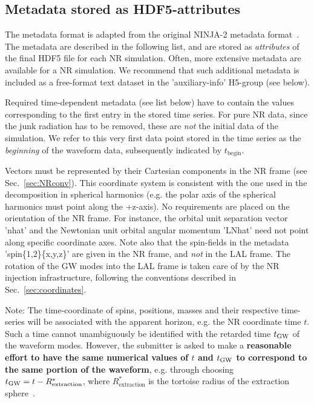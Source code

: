 \documentclass[11pt,tightenlines,article,amssymb,amsmath,amsfonts,superscriptaddress,nofootinbib]{revtex4}
\newcommand{\tGW}{t_{\rm GW}}
\begin{document}
\subsection{Metadata stored as HDF5-attributes}
\label{sec:meta}
The metadata format is adapted from the original NINJA-2 metadata format~\cite{Brown:2007jx}. The metadata are described in the following list, and are stored as \emph{attributes} of the final HDF5 file for each NR simulation. Often, more extensive metadata are available for a NR simulation. We recommend that such additional metadata is included as a free-format text dataset in the 'auxiliary-info' H5-group (see below). 

Required time-dependent metadata (see list below) have to contain the values corresponding to the first entry in the stored time series. For pure NR data, since the junk radiation has to be removed, these are \emph{not} the initial data of the simulation. We refer to this very first data point stored in the time series as the \emph{beginning} of the waveform data, subsequently indicated by $t_\mathrm{begin}$. 

Vectors must be represented by their Cartesian components in the NR frame (see Sec.~\ref{sec:NRconv}). This coordinate system is consistent with the one used in the decomposition in spherical harmonics (e.g. the polar axis of the spherical harmonics must point along the +z-axis). No requirements are placed on the orientation of the NR frame. For instance, the orbital unit separation vector 'nhat' and the Newtonian unit orbital angular momentum 'LNhat' need not point along specific coordinate axes. Note also that the spin-fields in the metadata 'spin\{1,2\}\{x,y,z\}' are given in the NR frame, and \emph{not} in the LAL frame. The rotation of the GW modes into the LAL frame is taken care of by the NR injection infrastructure, following the conventions described in Sec.~\ref{sec:coordinates}. 

Note: The time-coordinate of spins, positions, masses and their
respective time-series will be associated with the apparent horizon,
e.g. the NR coordinate time $t$. Such a time cannot
unambiguously be identified with the retarded time $\tGW$ of the
waveform modes.
\label{tGW-vs-tNR}
However, the submitter is asked to make a {\bf reasonable
effort to have the same numerical values of $t$ and $\tGW$
to correspond to the same portion of the waveform}, e.g. through
choosing $\tGW = t - R^*_\mathrm{extraction}$, where
$R^*_\mathrm{extraction}$ is the tortoise radius of the extraction sphere~\cite{Fiske:2005fx,Boyle:2009vi}. \\
\newline
\end{document}
